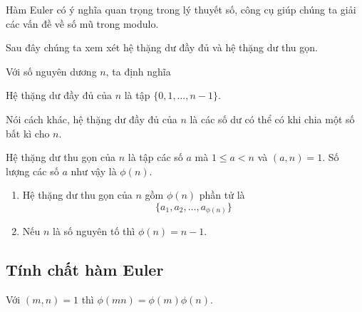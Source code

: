 Hàm Euler có ý nghĩa quan trọng trong lý thuyết số, công cụ giúp chúng ta giải các vấn đề về số mũ trong modulo.

Sau đây chúng ta xem xét hệ thặng dư đầy đủ và hệ thặng dư thu gọn.

Với số nguyên dương $n$, ta định nghĩa

\begin{definition}
    Hệ thặng dư đầy đủ của $n$ là tập $\{0, 1, \ldots, n-1\}$.
\end{definition}

Nói cách khác, hệ thặng dư đầy đủ của $n$ là các số dư có thể có khi chia một số bất kì cho $n$.

\begin{definition}
    Hệ thặng dư thu gọn của $n$ là tập các số $a$ mà $1 \leqslant a < n$ và $(a, n) = 1$. Số lượng các số $a$ như vậy là $\phi (n)$.  
\end{definition}

\begin{remark}
    \begin{enumerate}
        \item Hệ thặng dư thu gọn của $n$ gồm $\phi(n)$ phần tử là \[ \{a_1, a_2, \ldots, a_{\phi(n)}\} \]
        \item Nếu $n$ là số nguyên tố thì $\phi(n) = n-1$.
    \end{enumerate}
\end{remark}

\subsection*{Tính chất hàm Euler}

\begin{remark}
    Với $(m, n) = 1$ thì $\phi(m n) = \phi(m) \phi(n)$.
\end{remark}

